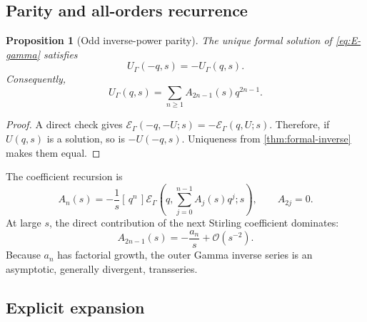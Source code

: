 \documentclass[11pt,a4paper]{article}
\numberwithin{equation}{section}
\newtheorem{proposition}[theorem]{Proposition}
\theoremstyle{definition}
\theoremstyle{remark}
\newcommand{\Ord}{\mathcal O}
\newcommand{\coeff}[2]{[\,#1^{#2}\,]}
\begin{document}
\subsection{Parity and all-orders recurrence}

\begin{proposition}[Odd inverse-power parity]\label{prop:gamma-parity}
The unique formal solution of \cref{eq:E-gamma} satisfies
\begin{equation}
 U_\Gamma(-q,s)=-U_\Gamma(q,s).
 \label{eq:gamma-odd}
\end{equation}
Consequently,
\begin{equation}
 U_\Gamma(q,s)=\sum_{n\ge1}A_{2n-1}(s)q^{2n-1}.
 \label{eq:gamma-odd-series}
\end{equation}
\end{proposition}

\begin{proof}
A direct check gives
\(\mathscr E_\Gamma(-q,-U;s)=-\mathscr E_\Gamma(q,U;s)\).
Therefore, if \(U(q,s)\) is a solution, so is \(-U(-q,s)\).  Uniqueness
from \cref{thm:formal-inverse} makes them equal.
\end{proof}

The coefficient recursion is
\begin{equation}
 A_n(s)=-\frac1s\coeff qn{
 \mathscr E_\Gamma\!\left(q,\sum_{j=0}^{n-1}A_j(s)q^j;s\right)},
 \qquad A_{2j}=0.
 \label{eq:gamma-recurrence}
\end{equation}
At large \(s\), the direct contribution of the next Stirling coefficient
dominates:
\begin{equation}
 A_{2n-1}(s)=-\frac{a_n}{s}+\Ord(s^{-2}).
 \label{eq:gamma-leading-An}
\end{equation}
Because \(a_n\) has factorial growth, the outer Gamma inverse series is an
asymptotic, generally divergent, transseries.

\subsection{Explicit expansion}
\end{document}
